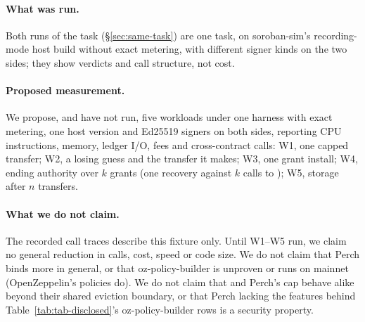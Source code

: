 \paragraph{What was run.} Both runs of the task (\S\ref{sec:same-task}) are one
task, on soroban-sim's recording-mode host build without exact metering, with
different signer kinds on the two sides; they show verdicts and call structure,
not cost.

\paragraph{Proposed measurement.} We propose, and have not run, five workloads
under one harness with exact metering, one host version and Ed25519 signers on
both sides, reporting CPU instructions, memory, ledger I/O, fees and
cross-contract calls: W1, one capped transfer; W2, a losing guess and the
transfer it makes; W3, one grant install; W4, ending authority over $k$ grants
(one recovery against $k$ calls to ); W5, storage
after $n$ transfers.

\paragraph{What we do not claim.} The recorded call traces describe this fixture
only. Until W1--W5 run, we claim no general reduction in calls, cost, speed or
code size. We do not claim that Perch
binds more in general, or that oz-policy-builder is unproven or runs on mainnet
(OpenZeppelin's  policies do). We do not claim that  and Perch's cap behave alike
beyond their shared eviction boundary, or that Perch lacking the features
behind Table~\ref{tab:tab-disclosed}'s oz-policy-builder rows is a security property.
